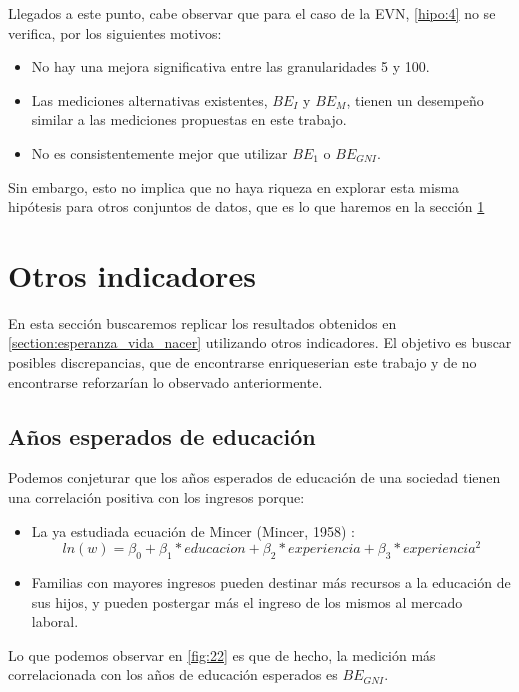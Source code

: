 Llegados a este punto, cabe observar que para el caso de la EVN, \ref{hipo:4} no se verifica, por los siguientes motivos:

\begin{itemize}
    \item No hay una mejora significativa entre las granularidades 5 y 100.
    \item Las mediciones alternativas existentes, $BE_I$ y $BE_M$, tienen un desempeño similar a las mediciones propuestas en este trabajo.
    \item No es consistentemente mejor que utilizar $BE_1$ o $BE_{GNI}$.
\end{itemize}

Sin embargo, esto no implica que no haya riqueza en explorar esta misma hipótesis para otros conjuntos de datos, que es lo que haremos en la sección \ref{section:otros_indicadores}

\section{Otros indicadores}\label{section:otros_indicadores}

En esta sección buscaremos replicar los resultados obtenidos en \ref{section:esperanza_vida_nacer} utilizando otros indicadores. El objetivo es buscar posibles discrepancias, que de encontrarse enriqueserian este trabajo y de no encontrarse reforzarían lo observado anteriormente.

\subsection{Años esperados de educación} 
Podemos conjeturar que los años esperados de educación de una sociedad tienen una correlación positiva con los ingresos porque:

\begin{itemize}
    \item La ya estudiada ecuación de Mincer (Mincer, 1958) \cite{mincer1958investment}: $$ ln(w) = \beta_0 + \beta_1 * educacion + \beta_2 * experiencia + \beta_3 * experiencia^2$$
    \item Familias con mayores ingresos pueden destinar más recursos a la educación de sus hijos, y pueden postergar más el ingreso de los mismos al mercado laboral.  
\end{itemize}

Lo que podemos observar en \ref{fig:22} es que de hecho, la medición más correlacionada con los años de educación esperados es $BE_{GNI}$. 

